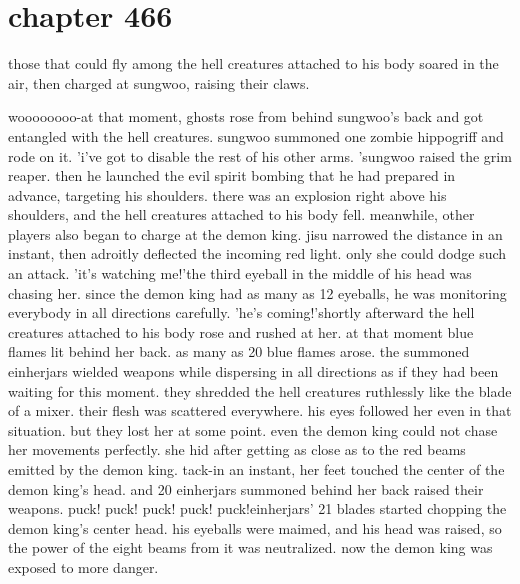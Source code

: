\section{chapter 466}

those that could fly among the hell creatures attached to his body soared in the air, then charged at sungwoo, raising their claws.





woooooooo-at that moment, ghosts rose from behind sungwoo's back and got entangled with the hell creatures.
 sungwoo summoned one zombie hippogriff and rode on it.
'i've got to disable the rest of his other arms.
'sungwoo raised the grim reaper.
 then he launched the evil spirit bombing that he had prepared in advance, targeting his shoulders.
there was an explosion right above his shoulders, and the hell creatures attached to his body fell.
meanwhile, other players also began to charge at the demon king.
jisu narrowed the distance in an instant, then adroitly deflected the incoming red light.
 only she could dodge such an attack.
 'it's watching me!'the third eyeball in the middle of his head was chasing her.
 since the demon king had as many as 12 eyeballs, he was monitoring everybody in all directions carefully.
'he's coming!'shortly afterward the hell creatures attached to his body rose and rushed at her.
 at that moment blue flames lit behind her back.
 as many as 20 blue flames arose.
the summoned einherjars wielded weapons while dispersing in all directions as if they had been waiting for this moment.
 they shredded the hell creatures ruthlessly like the blade of a mixer.
 their flesh was scattered everywhere.
his eyes followed her even in that situation.
 but they lost her at some point.
even the demon king could not chase her movements perfectly.
she hid after getting as close as to the red beams emitted by the demon king.
tack-in an instant, her feet touched the center of the demon king's head.
 and 20 einherjars summoned behind her back raised their weapons.
puck! puck! puck! puck! puck!einherjars' 21 blades started chopping the demon king's center head.
his eyeballs were maimed, and his head was raised, so the power of the eight beams from it was neutralized.
 now the demon king was exposed to more danger.
 
